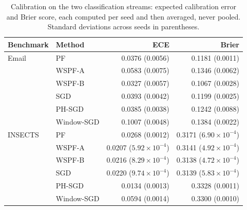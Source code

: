 \begin{table}[htbp]
\centering
\footnotesize
\setlength{\tabcolsep}{3pt}
\caption{Calibration on the two classification streams: expected calibration error and Brier score, each computed per seed and then averaged, never pooled. Standard deviations across seeds in parentheses.}
\label{tab:s3b_calibration}
\begin{tabular}{@{}llrr@{}}
\toprule
Benchmark & Method & ECE & Brier \\
\midrule
Email & PF & 0.0376 (0.0056) & 0.1181 (0.0011) \\
 & WSPF-A & 0.0583 (0.0075) & 0.1346 (0.0062) \\
 & WSPF-B & 0.0327 (0.0057) & 0.1067 (0.0028) \\
 & SGD & 0.0393 (0.0042) & 0.1199 (0.0025) \\
 & PH-SGD & 0.0385 (0.0038) & 0.1242 (0.0088) \\
 & Window-SGD & 0.1007 (0.0048) & 0.1384 (0.0022) \\
\midrule
INSECTS & PF & 0.0268 (0.0012) & 0.3171 ($6.90\times 10^{-4}$) \\
 & WSPF-A & 0.0207 ($5.92\times 10^{-4}$) & 0.3141 ($4.92\times 10^{-4}$) \\
 & WSPF-B & 0.0216 ($8.29\times 10^{-4}$) & 0.3138 ($4.72\times 10^{-4}$) \\
 & SGD & 0.0220 ($9.74\times 10^{-4}$) & 0.3139 ($5.83\times 10^{-4}$) \\
 & PH-SGD & 0.0134 (0.0013) & 0.3328 (0.0011) \\
 & Window-SGD & 0.0594 (0.0014) & 0.3300 (0.0010) \\
\bottomrule
\end{tabular}
\end{table}
